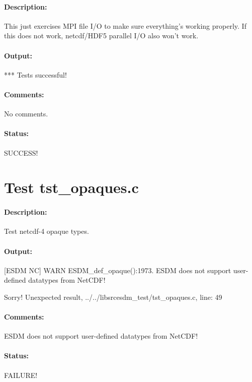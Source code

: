 \paragraph{Description:} This just exercises MPI file I/O to make sure everything's working properly. If this does not work, netcdf/HDF5 parallel I/O also won't work.

\paragraph{Output:} *** Tests successful!

\paragraph{Comments:} No comments.

\paragraph{Status:} SUCCESS!

\section{Test tst\_opaques.c}

\paragraph{Description:} Test netcdf-4 opaque types.

\paragraph{Output:} [ESDM NC] WARN ESDM\_def\_opaque():1973. ESDM does not support user-defined datatypes from NetCDF!

Sorry! Unexpected result, ../../libsrcesdm\_test/tst\_opaques.c, line: 49

\paragraph{Comments:} ESDM does not support user-defined datatypes from NetCDF!

\paragraph{Status:} FAILURE!

\section{{\color{blue}{FIX ME! Test tst\_parallel.c}}}

